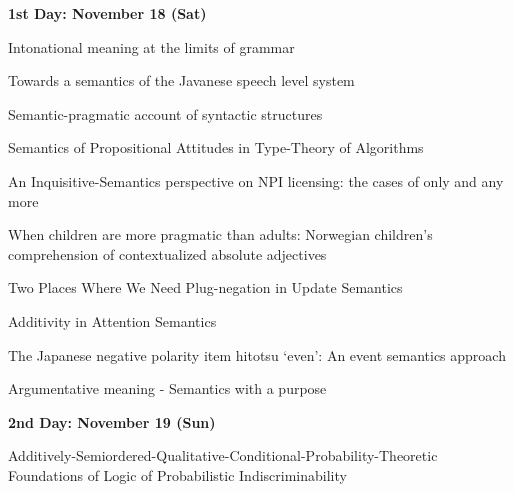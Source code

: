 \documentclass[12pt]{jarticle}
\begin{document}
\noindent\textbf{\large 
1st Day: November 18 (Sat)
}\\







  
      {Intonational meaning at the limits of grammar}
      {}
  
      {Towards a semantics of the Javanese speech level system}
      {}
  
      {Semantic-pragmatic account of syntactic structures}
      {}



 
  
      {Semantics of Propositional Attitudes in Type-Theory of Algorithms}
      {}
  
      {An Inquisitive-Semantics perspective on NPI licensing: the cases of only and any more}
      {}
  
      {When children are more pragmatic than adults: Norwegian children’s comprehension of contextualized absolute adjectives}
      {}



 
  
      {Two Places Where We Need Plug-negation in Update Semantics}
      {}
  
      {Additivity in Attention Semantics}
      {}
  
      {The Japanese negative polarity item hitotsu ‘even’: An event semantics approach}
      {}




  
      {Argumentative meaning - Semantics with a purpose}
      {}




\noindent\textbf{\large 
2nd Day: November 19 (Sun)
}\\




  
      {Additively-Semiordered-Qualitative-Conditional-Probability-Theoretic Foundations of Logic of Probabilistic Indiscriminability}
      {}
  
\end{document}

